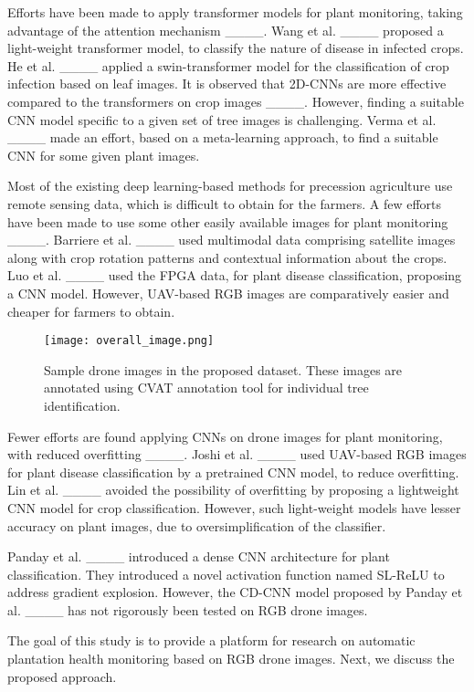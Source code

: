 Efforts have been made to apply transformer models for plant monitoring, taking advantage of the attention mechanism ____. Wang et al. ____ proposed a light-weight transformer model, to classify the nature of disease in infected crops. He et al. ____ applied a swin-transformer model for the classification of crop infection based on leaf images. It is observed that 2D-CNNs are more effective compared to the transformers on crop images ____. However, finding a suitable CNN model specific to a given set of tree images is challenging. Verma et al. ____ made an effort, based on a meta-learning approach, to find a suitable CNN for some given plant images.

Most of the existing deep learning-based methods for precession agriculture use remote sensing data, which is difficult to obtain for the farmers. A few efforts have been made to use some other easily available images for plant monitoring ____. Barriere et al. ____ used multimodal data comprising satellite images along with crop rotation patterns and contextual information about the crops. Luo et al. ____ used the FPGA data, for plant disease classification, proposing a CNN model. However, UAV-based RGB images are comparatively easier and cheaper for farmers to obtain.
\begin{figure}[!ht]
\centering
\texttt{[image: overall\_image.png]}
\caption{Sample drone images in the proposed dataset. These images are annotated using CVAT annotation tool for individual tree identification.}
\label{overall}
\end{figure}

Fewer efforts are found applying CNNs on drone images for plant monitoring, with reduced overfitting ____. Joshi et al. ____ used UAV-based RGB images for plant disease classification by a pretrained CNN model, to reduce overfitting. Lin et al. ____ avoided the possibility of overfitting by proposing a lightweight CNN model for crop classification. However, such light-weight models have lesser accuracy on plant images, due to oversimplification of the classifier.

Panday et al. ____ introduced a dense CNN architecture for plant classification. They introduced a novel activation function named SL-ReLU to address gradient explosion. However, the CD-CNN model proposed by Panday et al. ____ has not rigorously been tested on RGB drone images.

The goal of this study is to provide a platform for research on automatic plantation health monitoring based on RGB drone images. Next, we discuss the proposed approach.